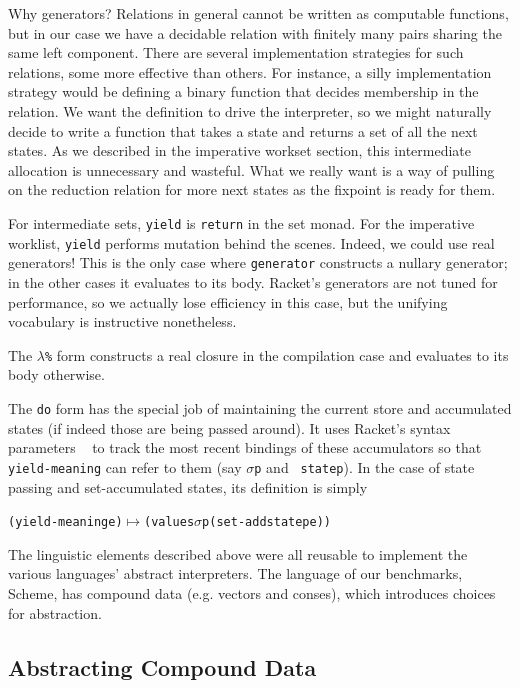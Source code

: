 \documentclass[preprint,onecolumn,9pt]{sigplanconf} %
\begin{document}
Why generators? Relations in general cannot be written as computable
functions, but in our case we have a decidable relation with finitely
many pairs sharing the same left component. There are several
implementation strategies for such relations, some more effective than
others. For instance, a silly implementation strategy would be
defining a binary function that decides membership in the relation. We
want the definition to drive the interpreter, so we might naturally
decide to write a function that takes a state and returns a set of all
the next states. As we described in the imperative workset section,
this intermediate allocation is unnecessary and wasteful. What we
really want is a way of pulling on the reduction relation for more
next states as the fixpoint is ready for them.

For intermediate sets, {\tt yield} is {\tt return} in the set
monad. For the imperative worklist, {\tt yield} performs mutation
behind the scenes. Indeed, we could use real generators! This is the
only case where {\tt generator} constructs a nullary generator; in the
other cases it evaluates to its body. Racket's generators are not
tuned for performance, so we actually lose efficiency in this case,
but the unifying vocabulary is instructive nonetheless.

The {\tt $\lambda$\%} form constructs a real closure in the
compilation case and evaluates to its body otherwise.

The {\tt do} form has the special job of maintaining the current store
and accumulated states (if indeed those are being passed around). It
uses Racket's syntax parameters ~\cite{dvanhorn:eli/stxparam} to
track the most recent bindings of these accumulators so that {\tt
  yield-meaning} can refer to them (say {\tt $\sigma$p} and {\tt
  statep}). In the case of state passing and set-accumulated states, its
definition is simply

\begin{center}
\begin{alltt}
(yield-meaning e) \(\longmapsto\) (values \(\sigma\)p (set-add statep e))
\end{alltt}
\end{center}

The linguistic elements described above were all reusable to implement
the various languages' abstract interpreters. The language of our
benchmarks, Scheme, has compound data (e.g. vectors and conses), which
introduces choices for abstraction.

\subsection{Abstracting Compound Data}
\end{document}
